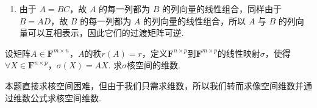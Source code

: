 \begin{exercise}
\begin{exgroup}
\begin{answer}
\begin{enumerate}
                充分性：由于 $A$ 与 $B$ 的列向量组等价，则 $A$ 与 $B$ 的列空间相同，令其维数为 $r$. 对 $A, B$ 分别作初等列变换，存在可逆矩阵 $Q_1, Q_2 \in \mathbf{R}^{n\times n}$，使得
                \[ AQ_1 = (A_1, 0), \qquad BQ_2 = (B_1, 0), \]
                其中 $A_1, B_1 \in \mathbf{R}^{m\times r}$ 均列满秩。又因 $A$ 与 $B$ 的列空间相同，故 $A_1$ 与 $B_1$ 是同一列空间的两组基，因此存在可逆矩阵 $M_1 \in \mathbf{R}^{r\times r}$，使得 $B_1 = A_1M_1$。

                于是
                \[ BQ_2=(B_1,0) = (A_1M_1,0) = (A_1,0) \begin{pmatrix}
                    M_1 & 0 \\ 0 & I_{n-r}
                \end{pmatrix} = AQ_1 \begin{pmatrix}
                    M_1 & 0 \\ 0 & I_{n-r}
                \end{pmatrix}. \]
                因此
                \[ B = AQ_1 \begin{pmatrix}
                    M_1 & 0\\ 0 & I_{n-r}
                \end{pmatrix} Q_2^{-1}. \]
                令
                \[ M = Q_1 \begin{pmatrix}
                    M_1 & 0 \\ 0 & I_{n-r}
                    \end{pmatrix} Q_2^{-1}, \]
                则 $M$ 可逆，且 $B = AM$。

                \item 由于 $A = BC$，故 $A$ 的每一列都为 $B$ 的列向量的线性组合，同样由于$B = AD$，故 $B$ 的每一列都为 $A$ 的列向量的线性组合，所以 $A$ 与 $B$ 的列向量可以互相表示，因此它们的过渡矩阵可逆.
            \end{enumerate}
        \end{answer}
    \end{exgroup}

    \begin{exgroup}
        \item 设矩阵$A \in \mathbf{F}^{m \times n}$，$A$的秩$r(A)=r$，定义$\mathbf{F}^{n \times p}$到$\mathbf{F}^{m \times p}$的线性映射$\sigma$，使得$\forall X \in \mathbf{F}^{n \times p}$，$\sigma(X)=AX$. 求$\sigma$核空间的维数.
        \begin{answer}
            本题直接求核空间困难，但由于我们只需求维数，所以我们转而求像空间维数并通过维数公式求核空间维数.


\end{answer}
\end{exgroup}
\end{exercise}
